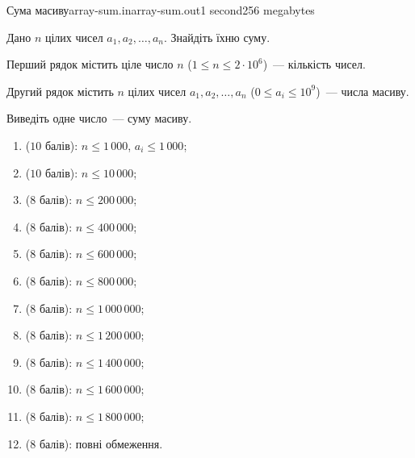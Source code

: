 \begin{problem}{Сума масиву}{array-sum.in}{array-sum.out}{1 second}{256 megabytes}

Дано $n$ цілих чисел $a_1, a_2, \ldots, a_n$. Знайдіть їхню суму.

\InputFile
Перший рядок містить ціле число $n$ ($1 \leq n \leq 2 \cdot 10^6$)~--- кількість чисел.

Другий рядок містить $n$ цілих чисел $a_1, a_2, \ldots, a_n$ ($0 \leq a_i \leq 10^9$)~--- числа масиву.

\OutputFile
Виведіть одне число~--- суму масиву.

\Scoring
\begin{enumerate}
\item ($10$ балів): $n \leq 1\,000$, $a_i \leq 1\,000$;
\item ($10$ балів): $n \leq 10\,000$;
\item ($8$ балів): $n \leq 200\,000$;
\item ($8$ балів): $n \leq 400\,000$;
\item ($8$ балів): $n \leq 600\,000$;
\item ($8$ балів): $n \leq 800\,000$;
\item ($8$ балів): $n \leq 1\,000\,000$;
\item ($8$ балів): $n \leq 1\,200\,000$;
\item ($8$ балів): $n \leq 1\,400\,000$;
\item ($8$ балів): $n \leq 1\,600\,000$;
\item ($8$ балів): $n \leq 1\,800\,000$;
\item ($8$ балів): повні обмеження.
\end{enumerate}


\Example

\begin{example}
%
\end{example}

\end{problem}

